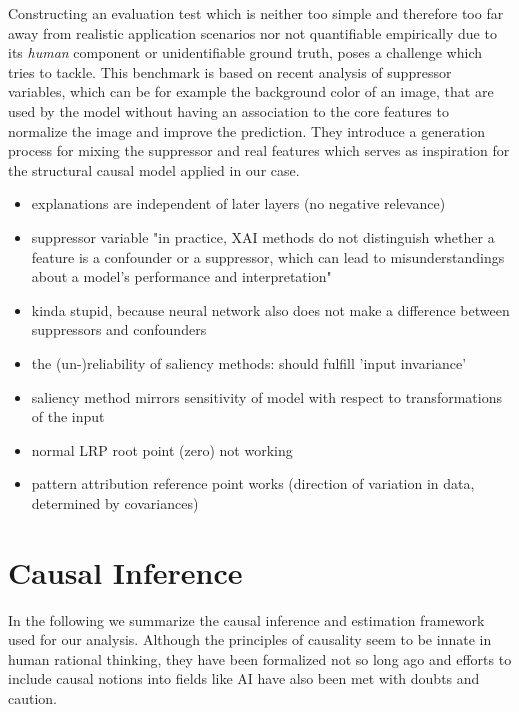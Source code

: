 Constructing an evaluation test which is neither too simple and therefore too far away from realistic application scenarios nor not quantifiable empirically due to its \textit{human} component or unidentifiable ground truth, poses a challenge which \cite{Clark2023} tries to tackle. This benchmark is based on recent analysis \cite{Wilming2023} of suppressor variables, which can be for example the background color of an image, that are used by the model without having an association to the core features to normalize the image and improve the prediction.
They introduce a generation process for mixing the suppressor and real features which serves as inspiration for the structural causal model applied in our case.

\begin{itemize}
      \item explanations are independent of later layers (no negative relevance) \cite{Sixt2020}
      \item suppressor variable "in practice, XAI methods do not distinguish whether a feature is a confounder or a suppressor, which can lead to misunderstandings about a model's performance and interpretation"
      \item kinda stupid, because neural network also does not make a difference between suppressors and confounders \cite{Wilming2023}
      \item the (un-)reliability of saliency methods: should fulfill 'input invariance'
      \item saliency method mirrors sensitivity of model with respect to transformations of the input
      \item normal LRP root point (zero) not working
      \item pattern attribution reference point works (direction of variation in data, determined by covariances) \cite{Kindermans2019}
\end{itemize}


\section{Causal Inference}
In the following we summarize the causal inference and estimation framework used for our analysis. 
Although the principles of causality seem to be innate in human rational thinking, they have been formalized not so long ago \cite{Spirtes1993, Halpern2005, Pearl2000} and efforts to include causal notions into fields like AI have also been met with doubts and caution. 

